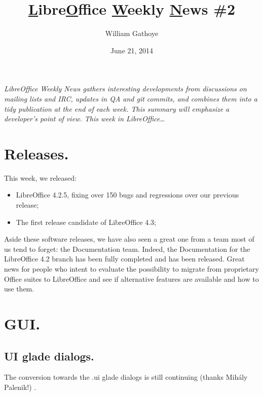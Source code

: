 \documentclass{article}
\begin{document}
\title{\underline{L}ibre\underline{O}ffice \underline{W}eekly \underline{N}ews \#2}
\author{William Gathoye}
\date{June 21, 2014}
\maketitle


\emph{LibreOffice Weekly News gathers interesting developments from discussions on mailing lists and IRC, updates in QA and git commits, and combines them into a tidy publication at the end of each week. This summary will emphasize a developer's point of view. This week in LibreOffice\ldots}

\tableofcontents



\section{Releases.}

This week, we released:

\begin{itemize}
    \item LibreOffice 4.2.5, fixing over 150 bugs and regressions over our previous release\cite{libo425};
    \item The first release candidate of LibreOffice 4.3\cite{libo43rc1};
\end{itemize}

Aside these software releases, we have also seen a great one from a team most of us tend to forget: the Documentation team. Indeed, the Documentation for the LibreOffice 4.2 branch has been fully completed and has been released\cite{doc42}. Great news for people who intent to evaluate the possibility to migrate from proprietary Office suites to LibreOffice and see if alternative features are available and how to use them.



\section{GUI.}

\subsection{UI glade dialogs.}

The conversion towards the .ui glade dialogs is still continuing (thanks Mihály Palenik!) \cite{gladeUi1,gladeUi2,gladeUi3,gladeUi4}.
\end{document}
